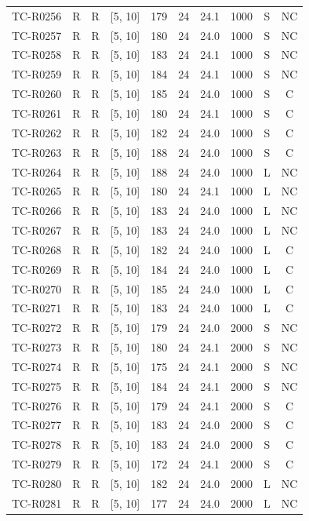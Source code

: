 \begin{longtable}{lccccccccc}
TC-R0256 & R & R & [5, 10] & 179 & 24 & 24.1 & 1000 & S & NC \\
TC-R0257 & R & R & [5, 10] & 180 & 24 & 24.0 & 1000 & S & NC \\
TC-R0258 & R & R & [5, 10] & 183 & 24 & 24.1 & 1000 & S & NC \\
TC-R0259 & R & R & [5, 10] & 184 & 24 & 24.1 & 1000 & S & NC \\
TC-R0260 & R & R & [5, 10] & 185 & 24 & 24.0 & 1000 & S & C \\
TC-R0261 & R & R & [5, 10] & 180 & 24 & 24.1 & 1000 & S & C \\
TC-R0262 & R & R & [5, 10] & 182 & 24 & 24.0 & 1000 & S & C \\
TC-R0263 & R & R & [5, 10] & 188 & 24 & 24.0 & 1000 & S & C \\
TC-R0264 & R & R & [5, 10] & 188 & 24 & 24.0 & 1000 & L & NC \\
TC-R0265 & R & R & [5, 10] & 180 & 24 & 24.1 & 1000 & L & NC \\
TC-R0266 & R & R & [5, 10] & 183 & 24 & 24.0 & 1000 & L & NC \\
TC-R0267 & R & R & [5, 10] & 183 & 24 & 24.0 & 1000 & L & NC \\
TC-R0268 & R & R & [5, 10] & 182 & 24 & 24.0 & 1000 & L & C \\
TC-R0269 & R & R & [5, 10] & 184 & 24 & 24.0 & 1000 & L & C \\
TC-R0270 & R & R & [5, 10] & 185 & 24 & 24.0 & 1000 & L & C \\
TC-R0271 & R & R & [5, 10] & 183 & 24 & 24.0 & 1000 & L & C \\
TC-R0272 & R & R & [5, 10] & 179 & 24 & 24.0 & 2000 & S & NC \\
TC-R0273 & R & R & [5, 10] & 180 & 24 & 24.1 & 2000 & S & NC \\
TC-R0274 & R & R & [5, 10] & 175 & 24 & 24.1 & 2000 & S & NC \\
TC-R0275 & R & R & [5, 10] & 184 & 24 & 24.1 & 2000 & S & NC \\
TC-R0276 & R & R & [5, 10] & 179 & 24 & 24.1 & 2000 & S & C \\
TC-R0277 & R & R & [5, 10] & 183 & 24 & 24.0 & 2000 & S & C \\
TC-R0278 & R & R & [5, 10] & 183 & 24 & 24.0 & 2000 & S & C \\
TC-R0279 & R & R & [5, 10] & 172 & 24 & 24.1 & 2000 & S & C \\
TC-R0280 & R & R & [5, 10] & 182 & 24 & 24.0 & 2000 & L & NC \\
TC-R0281 & R & R & [5, 10] & 177 & 24 & 24.0 & 2000 & L & NC \\

\end{longtable}
